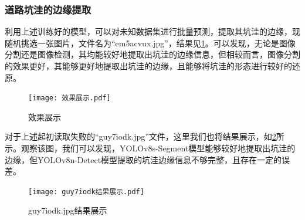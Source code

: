 \documentclass{MathorCupmodeling}
\begin{document}
	\subsubsection{道路坑洼的边缘提取}
	利用上述训练好的模型，可以对未知数据集进行批量预测，提取其坑洼的边缘，现随机挑选一张图片，文件名为“em5acvux.jpg”，结果见\textcolor{blue}{\cref{fig:效果展示}}。可以发现，无论是图像分割还是图像检测，其均能较好地提取出坑洼的边缘信息，但相较而言，图像分割的效果更好，其能够更好地提取出坑洼的边缘，且能够将坑洼的形态进行较好的还原。
	\begin{figure}[H]
		\centering
		\texttt{[image: 效果展示.pdf]}
		\caption{效果展示}
		\label{fig:效果展示}
	\end{figure}
	对于上述起初读取失败的“guy7iodk.jpg”文件，这里我们也将结果展示，如\textcolor{blue}{\cref{fig:guy7iodk结果展示}}所示。观察该图，我们可以发现，YOLOv8s-Segment模型能够较好地提取出坑洼的边缘，但YOLOv8n-Detect模型提取的坑洼边缘信息不够完整，且存在一定的误差。
	\begin{figure}[H]
		\centering
		\texttt{[image: guy7iodk结果展示.pdf]}
		\caption{guy7iodk.jpg结果展示}
		\label{fig:guy7iodk结果展示}
	\end{figure}
\end{document}
